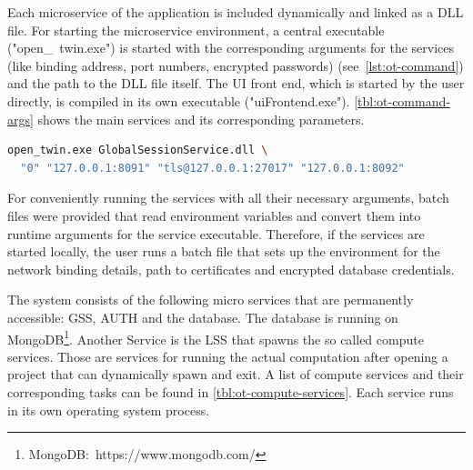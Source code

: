 Each microservice of the application is included dynamically and linked as a \ac{DLL} file. For starting the microservice environment, a central executable ("open\_\ twin.exe") is started with the corresponding arguments for the services (like binding address, port numbers, encrypted passwords) (see~\autoref{lst:ot-command}) and the path to the \ac{DLL} file itself. The UI front end, which is started by the user directly, is compiled in its own executable ("uiFrontend.exe"). \autoref{tbl:ot-command-args} shows the main services and its corresponding parameters.

\begin{lstlisting}[language=sh, caption={Command line of Open Twin Service start}, label=lst:ot-command]
open_twin.exe GlobalSessionService.dll \
  "0" "127.0.0.1:8091" "tls@127.0.0.1:27017" "127.0.0.1:8092"
\end{lstlisting}

For conveniently running the services with all their necessary arguments, batch files were provided that read environment variables and convert them into runtime arguments for the service executable. Therefore, if the services are started locally, the user runs a batch file that sets up the environment for the network binding details, path to certificates and encrypted database credentials.

The system consists of the following micro services that are permanently accessible: \acf{GSS}, \acf{AUTH} and the database. The database is running on MongoDB\footnote{MongoDB:~https://www.mongodb.com/}. Another Service is the \acf{LSS} that spawns the so called compute services. Those are services for running the actual computation after opening a project that can dynamically spawn and exit. A list of compute services and their corresponding tasks can be found in \autoref{tbl:ot-compute-services}.
Each service runs in its own operating system process.

